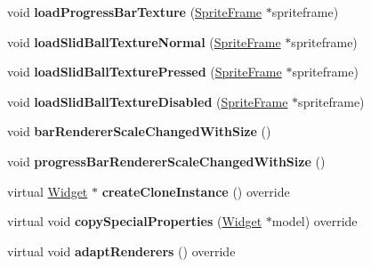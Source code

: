 \begin{DoxyCompactItemize}
\item 
\mbox{\label{classui_1_1Slider_a525b4d34c029e548b7d45db9cfd3499a}} 
void {\bfseries load\+Progress\+Bar\+Texture} (\hyperlink{classSpriteFrame}{Sprite\+Frame} $\ast$spriteframe)
\item 
\mbox{\label{classui_1_1Slider_a1069e115663db17e1f7dec261342f680}} 
void {\bfseries load\+Slid\+Ball\+Texture\+Normal} (\hyperlink{classSpriteFrame}{Sprite\+Frame} $\ast$spriteframe)
\item 
\mbox{\label{classui_1_1Slider_a0b0c0b0aa1b27b6d6400751818a0bcb7}} 
void {\bfseries load\+Slid\+Ball\+Texture\+Pressed} (\hyperlink{classSpriteFrame}{Sprite\+Frame} $\ast$spriteframe)
\item 
\mbox{\label{classui_1_1Slider_a31c8f741efd1f521f93d8d5f4aba2363}} 
void {\bfseries load\+Slid\+Ball\+Texture\+Disabled} (\hyperlink{classSpriteFrame}{Sprite\+Frame} $\ast$spriteframe)
\item 
\mbox{\label{classui_1_1Slider_a27cb867d5457007b5e693dc31796cd84}} 
void {\bfseries bar\+Renderer\+Scale\+Changed\+With\+Size} ()
\item 
\mbox{\label{classui_1_1Slider_a148f323386e35f4d0fc2e9239d53476d}} 
void {\bfseries progress\+Bar\+Renderer\+Scale\+Changed\+With\+Size} ()
\item 
\mbox{\label{classui_1_1Slider_ac1a695a2d72bf76d875054f8f9aad5e3}} 
virtual \hyperlink{classui_1_1Widget}{Widget} $\ast$ {\bfseries create\+Clone\+Instance} () override
\item 
\mbox{\label{classui_1_1Slider_abd4d81c0382a679ecb1903fb04e2c159}} 
virtual void {\bfseries copy\+Special\+Properties} (\hyperlink{classui_1_1Widget}{Widget} $\ast$model) override
\item 
\mbox{\label{classui_1_1Slider_a2b07742f28a24c75dbfc7c660e24e5f3}} 
virtual void {\bfseries adapt\+Renderers} () override
\end{DoxyCompactItemize}
